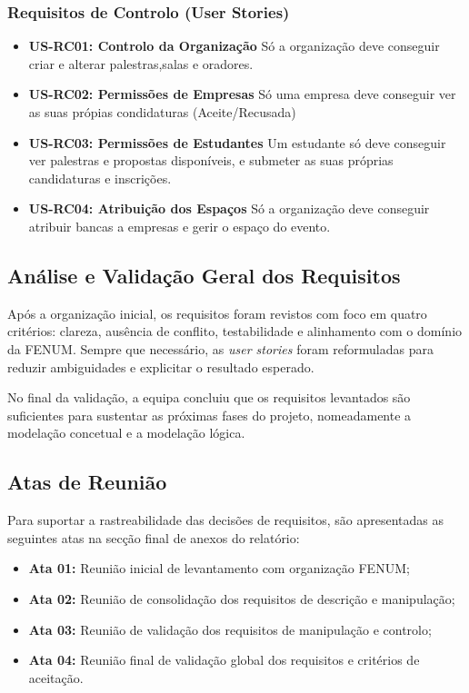 \documentclass[12pt,a4paper]{article}
\begin{document}
\subsubsection{Requisitos de Controlo (User Stories)}

\begin{itemize}[leftmargin=1.5cm]
    \item \textbf{US-RC01: Controlo da Organização} Só a organização deve conseguir criar e alterar palestras,salas e oradores.
    \item \textbf{US-RC02: Permissões de Empresas} Só uma empresa deve conseguir ver as suas própias condidaturas (Aceite/Recusada)
    \item \textbf{US-RC03: Permissões de Estudantes} Um estudante só deve conseguir ver palestras e propostas disponíveis, e submeter as suas próprias candidaturas e inscrições.
    \item \textbf{US-RC04: Atribuição dos Espaços} Só a organização deve conseguir atribuir bancas a empresas e gerir o espaço do evento.
\end{itemize}

\subsection{Análise e Validação Geral dos Requisitos}

Após a organização inicial, os requisitos foram revistos com foco em quatro
critérios: clareza, ausência de conflito, testabilidade e alinhamento com o
domínio da FENUM. Sempre que necessário, as \textit{user stories} foram
reformuladas para reduzir ambiguidades e explicitar o resultado esperado.

No final da validação, a equipa concluiu que os requisitos levantados são
suficientes para sustentar as próximas fases do projeto, nomeadamente a
modelação concetual e a modelação lógica.

\subsection{Atas de Reunião}

Para suportar a rastreabilidade das decisões de requisitos, são apresentadas as
seguintes atas na secção final de anexos do relatório:

\begin{itemize}[leftmargin=1.5cm]
    \item \textbf{Ata 01:} Reunião inicial de levantamento com organização
    FENUM;
    \item \textbf{Ata 02:} Reunião de consolidação dos requisitos de
    descrição e manipulação;
    \item \textbf{Ata 03:} Reunião de validação dos requisitos de
    manipulação e controlo;
    \item \textbf{Ata 04:} Reunião final de validação global dos requisitos
    e critérios de aceitação.
\end{itemize}
\end{document}
